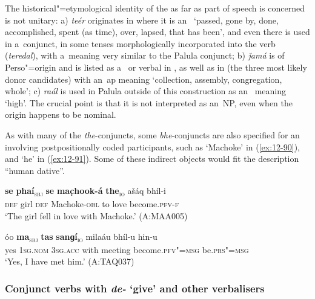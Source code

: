 \begin{exe}
The historical"=etymological identity of the  as far as part of speech is concerned is not unitary: a) \textit{teér} originates in \iliPashto where it is an~ `passed, gone by, done, accomplished, spent (as time), over, lapsed, that has been', and even there is used in a~conjunct, in some tenses morphologically incorporated into the verb (\textit{teredal}), with a~meaning very similar to the Palula conjunct; b) \textit{ǰamá} is of Perso"=\iliArabic origin and is listed as a~ or verbal  in \iliUrdu, \iliPashto as well as in \iliPersian (the three most likely donor candidates) with an~ap meaning `collection, assembly, congregation, whole'; c) \textit{raál} is used in Palula outside of this construction as an~ meaning `high'. The crucial point is that it is not interpreted as an~NP, even when the origin happens to be nominal. 


As with many of the \textit{the}-conjuncts, some \textit{bhe}-conjuncts are also specified for an~ involving postpositionally coded participants, such as `Machoke' in (\ref{ex:12-90}), and `he' in (\ref{ex:12-91}). Some of these indirect objects would fit the description ``human dative''. 

\begin{exe}
\ex
\label{ex:12-90}
\gll {\ob}\textbf{se} \textbf{phaí}{\cb}\textsubscript{\textsc{\upshape sbj}} {\ob}\textbf{se} \textbf{mac̣hook-á} \textbf{the}{\cb}\textsubscript{\textsc{\upshape io}} ašáq bhíl-i\\
\textsc{def} girl \textsc{def} Machoke-\textsc{obl} to love  become.\textsc{pfv-f}\\
\glt `The girl fell in love with Machoke.' (A:MAA005)
\end{exe}
\begin{exe}
\ex
\label{ex:12-91}
\gll óo {\ob}\textbf{ma}{\cb}\textsubscript{\textsc{\upshape sbj}} {\ob}\textbf{tas} \textbf{sanɡí}{\cb}\textsubscript{\textsc{\upshape io}} milaáu bhíl-u hin-u\\
yes \textsc{1sg.nom} \textsc{3sg.acc} with meeting become.\textsc{pfv"=msg}  be.\textsc{prs"=msg}\\
\glt `Yes, I have met him.' (A:TAQ037)
\end{exe}

\subsubsection*{Conjunct verbs with \textit{de-} `give' and other verbalisers}


\end{exe}
